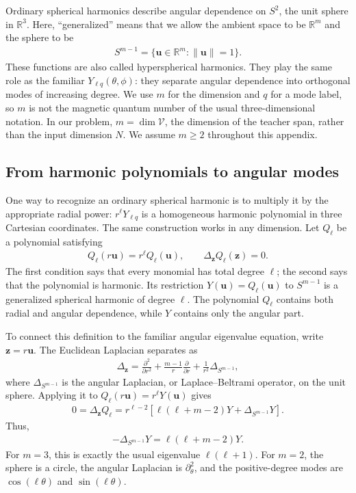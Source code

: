 \documentclass[11pt, reqno]{amsart}
\theoremstyle{notestyle}
\theoremstyle{defstyle}
\newcommand{\R}{\mathbb{R}}
\begin{document}
Ordinary spherical harmonics describe angular dependence on $S^2$, the unit sphere in $\R^3$.
Here, ``generalized'' means that we allow the ambient space to be $\R^m$ and the sphere to be
\begin{align*}
    S^{m-1}=\{\mathbf u\in\R^m:\|\mathbf u\|=1\}.
\end{align*}
These functions are also called hyperspherical harmonics.
They play the same role as the familiar $Y_{\ell q}(\theta,\phi)$: they separate angular dependence into orthogonal modes of increasing degree.
We use $m$ for the dimension and $q$ for a mode label, so $m$ is not the magnetic quantum number of the usual three-dimensional notation.
In our problem, $m=\dim\mathcal V$, the dimension of the teacher span, rather than the input dimension $N$.
We assume $m\geq2$ throughout this appendix.

\subsection{From harmonic polynomials to angular modes}
One way to recognize an ordinary spherical harmonic is to multiply it by the appropriate radial power: $r^\ell Y_{\ell q}$ is a homogeneous harmonic polynomial in three Cartesian coordinates.
The same construction works in any dimension.
Let $Q_\ell$ be a polynomial satisfying
\begin{align*}
    Q_\ell(r\mathbf u)=r^\ell Q_\ell(\mathbf u),
    \qquad \Delta_{\mathbf z}Q_\ell(\mathbf z)=0.
\end{align*}
The first condition says that every monomial has total degree $\ell$; the second says that the polynomial is harmonic.
Its restriction $Y(\mathbf u)=Q_\ell(\mathbf u)$ to $S^{m-1}$ is a generalized spherical harmonic of degree $\ell$.
The polynomial $Q_\ell$ contains both radial and angular dependence, while $Y$ contains only the angular part.

To connect this definition to the familiar angular eigenvalue equation, write $\mathbf z=r\mathbf u$.
The Euclidean Laplacian separates as
\begin{align*}
    \Delta_{\mathbf z}
    =\frac{\partial^2}{\partial r^2}
    +\frac{m-1}{r}\frac{\partial}{\partial r}
    +\frac{1}{r^2}\Delta_{S^{m-1}},
\end{align*}
where $\Delta_{S^{m-1}}$ is the angular Laplacian, or Laplace--Beltrami operator, on the unit sphere.
Applying it to $Q_\ell(r\mathbf u)=r^\ell Y(\mathbf u)$ gives
\begin{align*}
    0=\Delta_{\mathbf z}Q_\ell
    =r^{\ell-2}\left[\ell(\ell+m-2)Y+\Delta_{S^{m-1}}Y\right].
\end{align*}
Thus,
\begin{align}
    -\Delta_{S^{m-1}}Y=\ell(\ell+m-2)Y.
    \label{eq:appendix-harmonic-eigenvalue}
\end{align}
For $m=3$, this is exactly the usual eigenvalue $\ell(\ell+1)$.
For $m=2$, the sphere is a circle, the angular Laplacian is $\partial_\theta^2$, and the positive-degree modes are $\cos(\ell\theta)$ and $\sin(\ell\theta)$.
\end{document}
